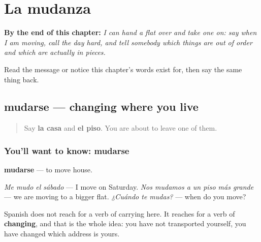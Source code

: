 
\chapter{La mudanza}
\label{ch:es-mudanza}

\begin{chapteropening}
\textbf{By the end of this chapter:} \emph{I can hand a flat over and take one on: say when I am moving, call the day hard, and tell somebody which things are out of order and which are actually in pieces.}

Read the message or notice this chapter's words exist for, then say the same thing back.
\end{chapteropening}

\section[mudarse]{mudarse — changing where you live}

\label{lesson:ES-C448-mudarse}



\begin{quote}
Say \textbf{la casa} and \textbf{el piso}. You are about to leave one of them.
\end{quote}

\subsection*{You'll want to know: mudarse}
\textbf{mudarse} — to move house.

\emph{Me mudo el sábado} — I move on Saturday. \emph{Nos mudamos a un piso más grande} — we are moving to a bigger flat. \emph{¿Cuándo te mudas?} — when do you move?

Spanish does not reach for a verb of carrying here. It reaches for a verb of \textbf{changing}, and that is the whole idea: you have not transported yourself, you have changed which address is yours.

